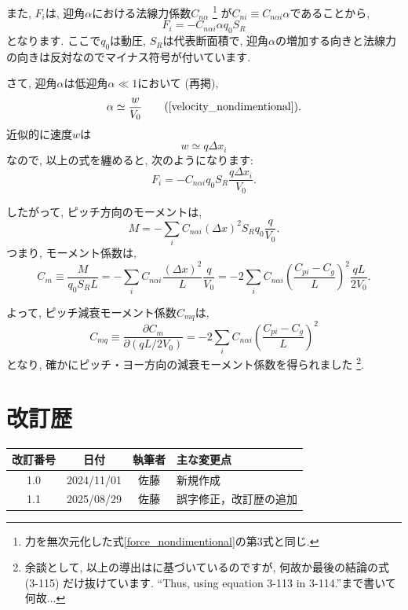 \documentclass[uplatex,dvipdfmx,a4j,11  pt]{jsarticle}
\begin{document}
また, $F_i$は, 迎角$\alpha$における法線力係数$C_{n\alpha}$
\footnote{力を無次元化した式\eqref{force_nondimentional}の第3式と同じ.}
が$C_{n i} \equiv C_{n\alpha i} \alpha$であることから, 
\begin{equation}
  F_i = - C_{n\alpha i} \alpha q_0 S_R
\end{equation}
となります.
ここで$q_0$は動圧, $S_R$は代表断面積で, 迎角$\alpha$の増加する向きと法線力の向きは反対なのでマイナス符号が付いています.

さて, 迎角$\alpha$は低迎角$\alpha \ll 1$において (再掲), 
\begin{equation}
  \alpha \simeq \frac{w}{V_0} \tag{\ref{velocity_nondimentional}}.
\end{equation}
近似的に速度$w$は
\begin{equation}
  w \simeq q \Delta x_i
\end{equation}
なので, 以上の式を纏めると, 次のようになります:
\begin{equation}
  F_i = - C_{n\alpha i} q_0 S_R\frac{q\Delta x_i}{V_0}.
\end{equation}

したがって, ピッチ方向のモーメントは,
\begin{equation}
  M = -\sum_i C_{n\alpha i} (\Delta x)^2 S_R q_0 \frac{q}{V_0}.
\end{equation}
つまり, モーメント係数は,
\begin{equation}
  C_{m} \equiv \frac{M}{q_0 S_R L} = - \sum_i C_{n\alpha i} \frac{(\Delta x)^2}{L} \frac{q}{V_0} = - 2\sum_i C_{n\alpha i} \left(\frac{C_{pi} - C_g}{L}\right)^2 \frac{q L}{2V_0}.
\end{equation}

よって, ピッチ減衰モーメント係数$C_{mq}$は,
\begin{equation}
  C_{mq} \equiv \frac{\partial C_m}{\partial (qL/2V_0)} = - 2\sum_i C_{n\alpha i} \left(\frac{C_{pi} - C_g}{L}\right)^2
\end{equation}
となり, 確かにピッチ・ヨー方向の減衰モーメント係数を得られました
\footnote{余談として, 以上の導出は\cite{barrowman}に基づいているのですが, 何故か最後の結論の式 (3-115) だけ抜けています. ``Thus, using equation 3-113 in 3-114.''まで書いて何故...}.





\newpage

\section*{改訂歴}

\begin{center}
  \begin{tabular}{cccl}
    \hline
    改訂番号 & 日付 & 執筆者 & 主な変更点\\
    \hline \hline
    1.0 & 2024/11/01 & 佐藤 & 新規作成\\
    1.1 & 2025/08/29 & 佐藤 & 誤字修正，改訂歴の追加\\
    \hline
  \end{tabular}
\end{center}
\end{document}
